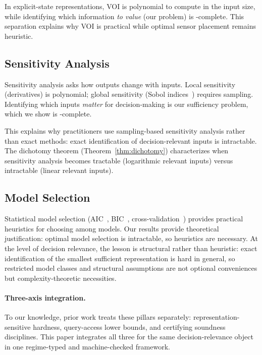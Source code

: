 In explicit-state representations, VOI is polynomial to compute in the input size, while identifying which information \emph{to value} (our problem) is \coNP-complete. This separation explains why VOI is practical while optimal sensor placement remains heuristic.

\subsection{Sensitivity Analysis}

Sensitivity analysis asks how outputs change with inputs. Local sensitivity (derivatives) is polynomial; global sensitivity (Sobol indices~\cite{sobol2001global}) requires sampling. Identifying which inputs \emph{matter} for decision-making is our sufficiency problem, which we show is \coNP-complete.

This explains why practitioners use sampling-based sensitivity analysis rather than exact methods: exact identification of decision-relevant inputs is intractable. The dichotomy theorem (Theorem~\ref{thm:dichotomy}) characterizes when sensitivity analysis becomes tractable (logarithmic relevant inputs) versus intractable (linear relevant inputs).

\subsection{Model Selection}

Statistical model selection (AIC~\cite{akaike1974new}, BIC~\cite{schwarz1978estimating}, cross-validation~\cite{stone1974cross}) provides practical heuristics for choosing among models. Our results provide theoretical justification: optimal model selection is intractable, so heuristics are necessary.
At the level of decision relevance, the lesson is structural rather than heuristic: exact identification of the smallest sufficient representation is hard in general, so restricted model classes and structural assumptions are not optional conveniences but complexity-theoretic necessities.

\paragraph{Three-axis integration.}
To our knowledge, prior work treats these pillars separately: representation-sensitive hardness, query-access lower bounds, and certifying soundness disciplines. This paper integrates all three for the same decision-relevance object in one regime-typed and machine-checked framework.
